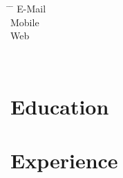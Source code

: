 \documentclass[12pt]{report} %
\begin{document}






\begin{minipage}{0.45\textwidth}
\begin{tabbing}
\hspace{3cm} \= \hspace{4cm} \= \kill %
E-Mail  \> \href{mailto:\varEmail}{\varEmail} \\
Mobile  \> \varMobile \\
\DoIfNotEmpty{\varWeb}
{Web \> \href{\varWeb}{\varWeb} \\}%
\end{tabbing}
\end{minipage}%
\hfill
\begin{minipage}{0.3\textwidth}%
\varAddress \\%
\end{minipage}%



\section{Education}

\education{}
\begin{list}{}%
         {\setlength{\leftmargin}{0.19\linewidth}}%
         \item[]%
{\small{\color{gray}\varEducationInfo{}}}
\end{list}



\section{Experience}

\professional{}


\end{document}
